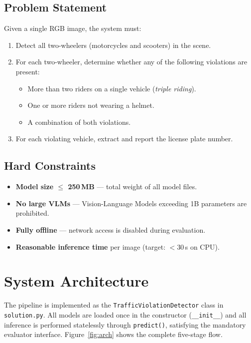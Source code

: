 \documentclass[12pt,a4paper]{article}
\begin{document}
\subsection{Problem Statement}
Given a single RGB image, the system must:
\begin{enumerate}[label=\arabic*.]
  \item Detect all two-wheelers (motorcycles and scooters) in the scene.
  \item For each two-wheeler, determine whether any of the following violations are present:
    \begin{itemize}
      \item More than two riders on a single vehicle (\emph{triple riding}).
      \item One or more riders not wearing a helmet.
      \item A combination of both violations.
    \end{itemize}
  \item For each violating vehicle, extract and report the license plate number.
\end{enumerate}

\subsection{Hard Constraints}
\begin{itemize}
  \item \textbf{Model size $\leq$ 250\,MB} — total weight of all model files.
  \item \textbf{No large VLMs} — Vision-Language Models exceeding 1B parameters are prohibited.
  \item \textbf{Fully offline} — network access is disabled during evaluation.
  \item \textbf{Reasonable inference time} per image (target: $< 30$\,s on CPU).
\end{itemize}

\section{System Architecture}

The pipeline is implemented as the \texttt{TrafficViolationDetector} class in
\texttt{solution.py}. All models are loaded once in the constructor (\texttt{\_\_init\_\_})
and all inference is performed statelessly through \texttt{predict()}, satisfying the
mandatory evaluator interface. Figure~\ref{fig:arch} shows the complete five-stage flow.
\end{document}
